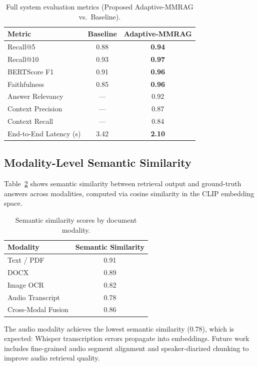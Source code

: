 \documentclass[conference]{IEEEtran}
\begin{document}
\begin{table}[h]
\centering
\caption{Full system evaluation metrics (Proposed Adaptive-MMRAG vs.\ Baseline).}
\label{tab:ragas}
\renewcommand{\arraystretch}{1.2}
\begin{tabular}{lcc}
\toprule
\textbf{Metric} & \textbf{Baseline} & \textbf{Adaptive-MMRAG}\\
\midrule
Recall@5       & 0.88 & \textbf{0.94}\\
Recall@10      & 0.93 & \textbf{0.97}\\
BERTScore F1   & 0.91 & \textbf{0.96}\\
Faithfulness   & 0.85 & \textbf{0.96}\\
Answer Relevancy & — & 0.92\\
Context Precision & — & 0.87\\
Context Recall    & — & 0.84\\
End-to-End Latency (s) & 3.42 & \textbf{2.10}\\
\bottomrule
\end{tabular}
\end{table}

\subsection{Modality-Level Semantic Similarity}

Table~\ref{tab:modality} shows semantic similarity between retrieval output
and ground-truth answers across modalities, computed via cosine similarity
in the CLIP embedding space.

\begin{table}[h]
\centering
\caption{Semantic similarity scores by document modality.}
\label{tab:modality}
\renewcommand{\arraystretch}{1.2}
\begin{tabular}{lc}
\toprule
\textbf{Modality} & \textbf{Semantic Similarity}\\
\midrule
Text / PDF       & 0.91\\
DOCX             & 0.89\\
Image OCR        & 0.82\\
Audio Transcript & 0.78\\
Cross-Modal Fusion & 0.86\\
\bottomrule
\end{tabular}
\end{table}

The audio modality achieves the lowest semantic similarity (0.78), which is
expected: Whisper transcription errors propagate into embeddings. Future work
includes fine-grained audio segment alignment and speaker-diarized
chunking \cite{pyannote} to improve audio retrieval quality.
\end{document}
